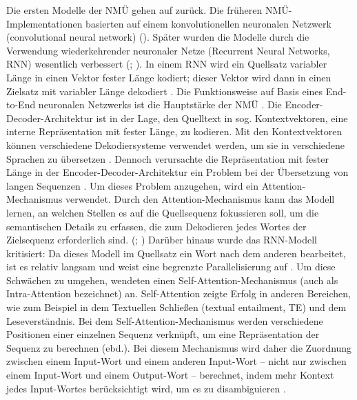 Die ersten Modelle der NMÜ gehen auf \citet{ÑecoForcada1997} zurück. Die früheren NMÜ-Implementationen basierten auf einem konvolutionellen neuronalen Netzwerk (convolutional neural network) (\citealt{KalchbrennerBlunsom2013}). Später wurden die Modelle durch die Verwendung wiederkehrender neuronaler Netze (Recurrent Neural Networks, RNN) wesentlich verbessert (\citealt{ChoEtAl2014}; \citealt{SutskeverEtAl2014}). In einem RNN wird ein Quellsatz variabler Länge in einen Vektor fester Länge kodiert; dieser Vektor wird dann in einen Zielsatz mit variabler Länge dekodiert \citep{BahdanauEtAl2015}. Die Funktionsweise auf Basis eines End-to-End neuronalen Netzwerks ist die Hauptstärke der NMÜ \citep{WuEtAl2016}. Die Encoder-Decoder-Architektur ist in der Lage, den Quelltext in sog. Kontextvektoren, eine interne Repräsentation mit fester Länge, zu kodieren. Mit den Kontextvektoren können verschiedene Dekodiersysteme verwendet werden, um sie in verschiedene Sprachen zu übersetzen \citep{JohnsonEtAl2016}. Dennoch verursachte die Repräsentation mit fester Länge in der Encoder-Decoder-Architektur ein Problem bei der Übersetzung von langen Sequenzen \citep{Pouget-AbadieEtAl2014}. Um dieses Problem anzugehen, wird ein Attention-Mechanismus verwendet. Durch den Attention-Mechanismus kann das Modell lernen, an welchen Stellen es auf die Quellsequenz fokussieren soll, um die semantischen Details zu erfassen, die zum Dekodieren jedes Wortes der Zielsequenz erforderlich sind. (\citealt{BahdanauEtAl2015}; \citealt{LuongEtAl2015}) Darüber hinaus wurde das RNN-Modell kritisiert: Da dieses Modell im Quellsatz ein Wort nach dem anderen bearbeitet, ist es relativ langsam und weist eine begrenzte Parallelisierung auf \citep{Köhn2017}. Um diese Schwächen zu umgehen, wendeten \citet{VaswaniEtAl2017} einen Self-Attention-Mechanismus (auch als Intra-Attention bezeichnet) an. Self-Attention zeigte Erfolg in anderen Bereichen, wie zum Beispiel in dem Textuellen Schließen (textual entailment, TE) und dem Leseverständnis. Bei dem Self-Attention-Mechanismus werden verschiedene Positionen einer einzelnen Sequenz verknüpft, um eine Repräsentation der Sequenz zu berechnen (ebd.). Bei diesem Mechanismus wird daher die Zuordnung zwischen einem Input-Wort und einem anderen Input-Wort -- nicht nur zwischen einem Input-Wort und einem Output-Wort -- berechnet, indem mehr Kontext jedes Input-Wortes berücksichtigt wird, um es zu disambiguieren \citep{Köhn2017}.

